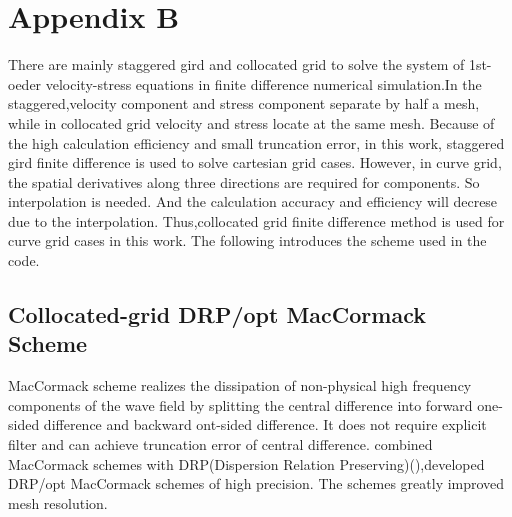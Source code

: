 \chapter{Appendix B}\label{appd_schemes}
There are mainly staggered gird and collocated grid to solve the system of 1st-oeder velocity-stress equations in finite difference numerical simulation.In the staggered,velocity component and stress component separate by half a mesh, while in collocated grid velocity and stress locate at the same mesh. Because of the high calculation efficiency and small truncation error, in this work, staggered gird finite difference is used to solve cartesian grid cases. However, in curve grid, the spatial derivatives along three directions are required for components. So interpolation is needed. And the calculation accuracy and efficiency will decrese due to the interpolation. Thus,collocated grid finite difference method is used for curve grid cases in this work. The following introduces the scheme used in the code.
\section{Collocated-grid DRP/opt MacCormack Scheme} 
MacCormack scheme realizes the dissipation of non-physical high frequency components of the wave field by splitting the central difference into forward one-sided difference and backward ont-sided difference. It does not require explicit filter and can achieve truncation error of central difference.\cite{hixon1997increasing} combined MacCormack schemes with DRP(Dispersion Relation Preserving)(\cite{tam1993dispersion}),developed DRP/opt MacCormack schemes of high precision. The schemes greatly improved mesh resolution.

